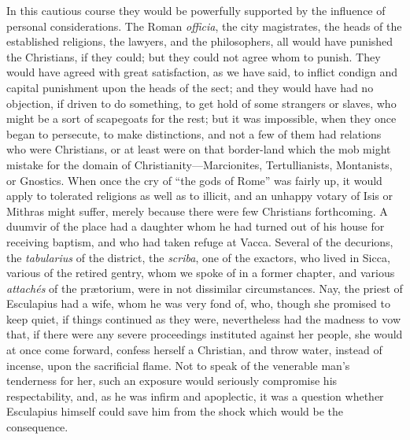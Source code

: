 In this cautious course they would be powerfully supported by the
influence of personal considerations. The Roman \emph{officia}, the
city magistrates, the heads of the established religions, the lawyers,
and the philosophers, all would have punished the Christians, if they
could; but they could not agree whom to punish. They would have agreed
with great satisfaction, as we have said, to inflict condign and
capital punishment upon the heads of the sect; and they would have had
no objection, if driven to do something, to get hold of some
strangers or slaves, who might be a sort of scapegoats for the rest;
but it was impossible, when they once began to persecute, to make
distinctions, and not a few of them had relations who were Christians,
or at least were on that border-land which the mob might mistake for
the domain of Christianity—Marcionites, Tertullianists, Montanists,
or Gnostics. When once the cry of ``the gods of Rome'' was
fairly up, it would apply to tolerated religions as well as to
illicit, and an unhappy votary of Isis or Mithras might suffer, merely
because there were few Christians forthcoming. A duumvir of the place
had a daughter whom he had turned out of his house for receiving
baptism, and who had taken refuge at Vacca. Several of the decurions,
the \emph{tabularius} of the district, the \emph{scriba}, one of the
exactors, who lived in Sicca, various of the retired gentry, whom we
spoke of in a former chapter, and various \emph{attachés} of the
prætorium, were in not dissimilar circumstances. Nay, the priest of
Esculapius had a wife, whom he was very fond of, who, though she
promised to keep quiet, if things continued as they were, nevertheless
had the madness to vow that, if there were any severe proceedings
instituted against her people, she would at once come forward, confess
herself a Christian, and throw water, instead of incense, upon the
sacrificial flame. Not to speak of the venerable man's tenderness for
her, such an exposure would seriously compromise his respectability,
and, as he was infirm and apoplectic, it was a question whether
Esculapius himself could save him from the shock which would be
the consequence.

